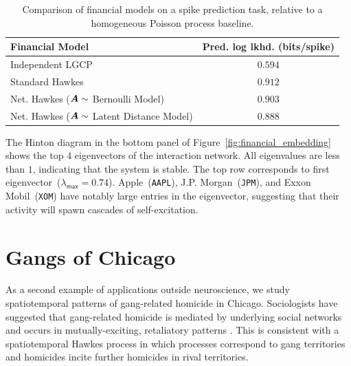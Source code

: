 \begin{table}
  \begin{center}
    \begin{tabular}{l|c}
      \textbf{Financial Model} & \textbf{Pred. log lkhd. (bits/spike)} \\
      \hline
      Independent LGCP & $0.594$ \\
      Standard Hawkes & $0.912$ \\
      Net. Hawkes ($\boldsymbol{A} \sim $ Bernoulli Model) & $0.903$ \\
      Net. Hawkes ($\boldsymbol{A} \sim $ Latent Distance Model) & $0.888$ \\
    \end{tabular}
  \end{center}
    \caption{Comparison of financial models on a spike prediction task, relative to a homogeneous Poisson process baseline.}
    \label{tab:financial_pred_ll}
\end{table}


The Hinton diagram in the bottom panel of
Figure~\ref{fig:financial_embedding} shows the top $4$ eigenvectors of
the interaction network. All eigenvalues are less than $1$, indicating
that the system is stable. The top row corresponds to first
eigenvector~(${\lambda_{\mathsf{max}}=0.74}$). Apple~(\texttt{AAPL}),
J.P. Morgan~(\texttt{JPM}), and Exxon Mobil~(\texttt{XOM}) have
notably large entries in the eigenvector, suggesting that their
activity will spawn cascades of self-excitation.

\section{Gangs of Chicago}
\label{sec:chicago}
As a second example of applications outside neuroscience,
we study spatiotemporal patterns of gang-related
homicide in Chicago. Sociologists have suggested that gang-related
homicide is mediated by underlying social networks and occurs in
mutually-exciting, retaliatory patterns \citep{Papachristos-2009}. This
is consistent with a spatiotemporal Hawkes process in which processes
correspond to gang territories and homicides incite further homicides
in rival territories.

